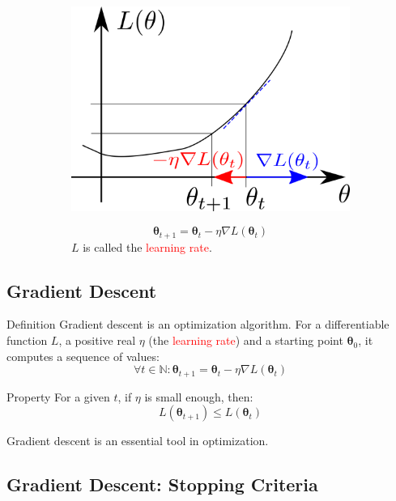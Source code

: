\documentclass{book}
\newcommand{\lr}{\eta} %
\newcommand{\loss}{L}
\newcommand{\param}{\boldsymbol{\theta}}
\newcommand{\N}{\mathbb{N}}
\newcommand{\alert}[1]{\textcolor{red}{#1}}
\begin{document}
\begin{figure}[h]
    \centering
    \begin{subfigure}{.5\textwidth}
        \includegraphics[width=\textwidth]{gradient_descent}
    \end{subfigure}
    \begin{subfigure}{.5\textwidth}
        \[
        \param_{t+1} = \param_t - \lr\nabla \loss(\param_t)
        \]
        $\loss$ is called the \alert{learning rate}.
    \end{subfigure}
\end{figure}

\subsection{Gradient Descent}

\begin{block}{Definition}
Gradient descent is an optimization algorithm. For a differentiable function $\loss$, a positive real $\lr$ (the \alert{learning rate}) and a starting point $\param_0$, it computes a sequence of values:
\[
\forall t \in \N: \param_{t+1} = \param_t - \lr \nabla \loss(\param_t)
\]
\end{block}

\begin{block}{Property}
For a given $t$, if $\lr$ is small enough, then:
\[
\loss(\param_{t+1}) \leq \loss(\param_t)
\]
\end{block}

Gradient descent is an essential tool in optimization.

\subsection{Gradient Descent: Stopping Criteria}
\end{document}
